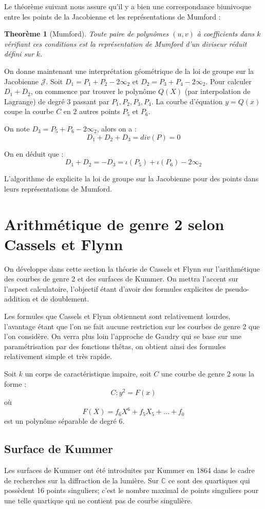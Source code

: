 \documentclass[a4paper,12pt]{article}
\newtheorem{theoreme}{Theorème}[section]
\theoremstyle{definition}
\theoremstyle{remark}
\numberwithin{equation}{section}
\begin{document}
Le théorème suivant nous assure qu'il y a bien une correspondance biunivoque entre les points de la Jacobienne et les représentations de Mumford :

\begin{theoreme}[Mumford]
Toute paire de polynômes $(u,v)$ à coefficients dans $k$ vérifiant ces conditions est la représentation de Mumford d'un diviseur réduit défini sur $k$.
\end{theoreme}

On donne maintenant une interprétation géométrique de la loi de groupe sur la Jacobienne $\mathcal{J}$. Soit $D_1 = P_1 + P_2 - 2\infty_2$ et $D_2 = P_3 + P_4 - 2\infty_2$. Pour calculer $D_1 + D_2$, on commence par trouver le polynôme $Q(X)$ (par interpolation de Lagrange) de degré $3$ passant par $P_1,P_2,P_3,P_4$. La courbe d'équation $y = Q(x)$ coupe la courbe $C$ en $2$ autres points $P_5$ et $P_6$.

On note $D_3 = P_5 + P_6 - 2\infty_2$, alors on a :
$$D_1 + D_2 + D_3 = div(P) = 0$$

On en déduit que :
$$D_1 + D_2 = -D_3 = \iota(P_5) + \iota(P_6) - 2\infty_2$$

L'algorithme de \citet{cantor} explicite la loi de groupe sur la Jacobienne pour des points dans leurs représentations de Mumford.

\section{Arithmétique de genre 2 selon Cassels et Flynn}
On développe dans cette section la théorie de Cassels et Flynn sur l'arithmétique des courbes de genre 2 et des surfaces de Kummer. On mettra l'accent sur l'aspect calculatoire, l'objectif étant d'avoir des formules explicites de pseudo-addition et de doublement.

Les formules que Cassels et Flynn obtiennent sont relativement lourdes, l'avantage étant que l'on ne fait aucune restriction sur les courbes de genre 2 que l'on considère. On verra plus loin l'approche de Gaudry qui se base sur une paramétrisation par des fonctions thêtas, on obtient ainsi des formules relativement simple et très rapide.

Soit $k$ un corps de caractéristique impaire, soit $C$ une courbe de genre 2 sous la forme :
$$C : y^2 = F(x)$$
où $$F(X) = f_6X^6 + f_5X_5 + ... + f_0$$ est un polynôme séparable de degré 6.

\subsection{Surface de Kummer}
Les surfaces de Kummer ont été introduites par Kummer en 1864 dans le cadre de recherches sur la diffraction de la lumière. Sur $\mathbb{C}$ ce sont des quartiques qui possèdent 16 points singuliers; c'est le nombre maximal de points singuliers pour une telle quartique qui ne contient pas de courbe singulière.
\end{document}
